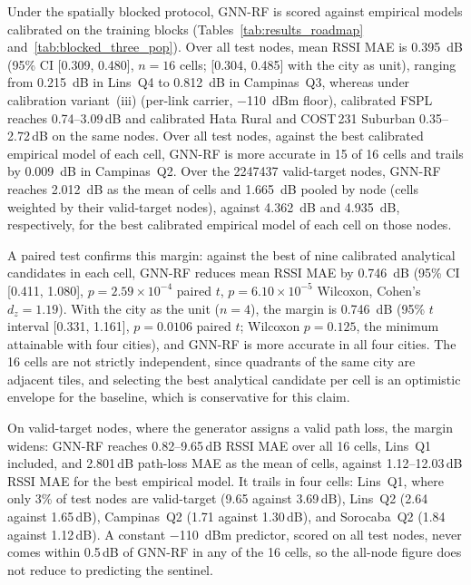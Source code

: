 \documentclass{ieeeaccess}
\begin{document}
Under the spatially blocked protocol, GNN-RF is scored against empirical models calibrated on the training blocks (Tables~\ref{tab:results_roadmap} and~\ref{tab:blocked_three_pop}). Over all test nodes, mean RSSI MAE is \SI{0.395}{\deci\bel} (95\% CI [\num{0.309}, \num{0.480}], $n{=}16$ cells; [\num{0.304}, \num{0.485}] with the city as unit), ranging from \SI{0.215}{\deci\bel} in Lins~Q4 to \SI{0.812}{\deci\bel} in Campinas~Q3, whereas under calibration variant~(iii) (per-link carrier, $-$110~dBm floor), calibrated FSPL reaches 0.74--3.09\,dB and calibrated Hata Rural and COST\,231 Suburban 0.35--2.72\,dB on the same nodes. Over all test nodes, against the best calibrated empirical model of each cell, GNN-RF is more accurate in 15 of 16 cells and trails by \SI{0.009}{\deci\bel} in Campinas~Q2. Over the \num{2247437} valid-target nodes, GNN-RF reaches \SI{2.012}{\deci\bel} as the mean of cells and \SI{1.665}{\deci\bel} pooled by node (cells weighted by their valid-target nodes), against \SI{4.362}{\deci\bel} and \SI{4.935}{\deci\bel}, respectively, for the best calibrated empirical model of each cell on those nodes.



A paired test confirms this margin: against the best of nine calibrated analytical candidates in each cell, GNN-RF reduces mean RSSI MAE by \SI{0.746}{\deci\bel} (95\% CI [0.411, 1.080], $p{=}2.59\times10^{-4}$ paired $t$, $p{=}6.10\times10^{-5}$ Wilcoxon, Cohen's $d_z{=}1.19$). With the city as the unit ($n{=}4$), the margin is \SI{0.746}{\deci\bel} (95\% $t$ interval [0.331, 1.161], $p{=}0.0106$ paired $t$; Wilcoxon $p{=}0.125$, the minimum attainable with four cities), and GNN-RF is more accurate in all four cities. The 16 cells are not strictly independent, since quadrants of the same city are adjacent tiles, and selecting the best analytical candidate per cell is an optimistic envelope for the baseline, which is conservative for this claim.

On valid-target nodes, where the generator assigns a valid path loss, the margin widens: GNN-RF reaches 0.82--9.65\,dB RSSI MAE over all 16 cells, Lins~Q1 included, and 2.801\,dB path-loss MAE as the mean of cells, against 1.12--12.03\,dB RSSI MAE for the best empirical model. It trails in four cells: Lins~Q1, where only 3\% of test nodes are valid-target (9.65 against 3.69\,dB), Lins~Q2 (2.64 against 1.65\,dB), Campinas~Q2 (1.71 against 1.30\,dB), and Sorocaba~Q2 (1.84 against 1.12\,dB). A constant $-$110~dBm predictor, scored on all test nodes, never comes within 0.5\,dB of GNN-RF in any of the 16 cells, so the all-node figure does not reduce to predicting the sentinel.
\end{document}
